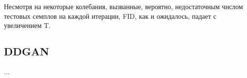 \documentclass{article}
\begin{document}
Несмотря на некоторые колебания, вызванные, вероятно, недостаточным числом тестовых семплов на каждой итерации, FID, как и ожидалось, падает с увеличением T.

\subsection{DDGAN}
...






\end{document}
